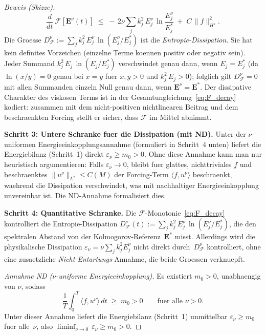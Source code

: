 \documentclass[12pt,a4paper]{article}
\theoremstyle{definition}
\theoremstyle{plain}
\theoremstyle{remark}
\begin{document}
\begin{proof}[Beweis (Skizze)]
\begin{equation}\label{eq:F_decay}
  \frac{d}{dt}\,\mathcal{F}[\mathbf{E}^\nu(t)]
  \;\le\;
  -\,2\nu \sum_{j} k_j^2\,
    E_j^\nu\,\ln\!\frac{E_j^\nu}{E_j^*}
  \;+\;
  C\,\|f\|_{H^s}^2.
\end{equation}
Die Groesse $D_\mathcal{F}^\nu := \sum_j k_j^2\,
E_j^\nu\,\ln(E_j^\nu/E_j^*)$ ist die \emph{Entropie-Dissipation}.
Sie hat kein definites Vorzeichen (einzelne Terme koennen positiv oder
negativ sein). Jeder Summand $k_j^2\,E_j\,\ln(E_j/E_j^*)$ verschwindet
genau dann, wenn $E_j = E_j^*$ (da $\ln(x/y) = 0$ genau bei $x = y$
fuer $x,y > 0$ und $k_j^2\,E_j > 0$); folglich gilt
$D_\mathcal{F}^\nu = 0$ mit allen Summanden einzeln Null genau dann,
wenn $\mathbf{E}^\nu = \mathbf{E}^*$. Der dissipative Charakter des viskosen Terms
ist in der Gesamtungleichung~\eqref{eq:F_decay} kodiert: zusammen mit
dem nicht-positiven nichtlinearen Beitrag und dem beschraenkten Forcing
stellt er sicher, dass $\mathcal{F}$ im Mittel abnimmt.

\textbf{Schritt 3: Untere Schranke fuer die Dissipation (mit ND).}\;
Unter der $\nu$-uniformen Energieeinkopplungsannahme (formuliert in
Schritt~4 unten) liefert die Energiebilanz (Schritt~1) direkt
$\varepsilon_\nu \ge m_0 > 0$. Ohne diese Annahme kann man nur
heuristisch argumentieren: Falls $\varepsilon_\nu \to 0$, bleibt fuer
glattes, nichttriviales $f$ und beschraenktes $\|u^\nu\|_{L^2} \le C(M)$
der Forcing-Term $\langle f, u^\nu \rangle$ beschraenkt, waehrend die
Dissipation verschwindet, was mit nachhaltiger Energieeinkopplung
unvereinbar ist. Die ND-Annahme formalisiert dies.

\textbf{Schritt 4: Quantitative Schranke.}\;
Die $\mathcal{F}$-Monotonie~\eqref{eq:F_decay} kontrolliert die
Entropie-Dissipation $D_\mathcal{F}^\nu(t) := \sum_j k_j^2\,
E_j^\nu\,\ln(E_j^\nu/E_j^*)$, die den spektralen Abstand
von der Kolmogorov-Referenz~$\mathbf{E}^*$ misst.
Allerdings wird die physikalische Dissipation
$\varepsilon_\nu = \nu\sum_j k_j^2 E_j^\nu$ nicht direkt
durch~$D_\mathcal{F}^\nu$ kontrolliert, ohne eine zusaetzliche
\emph{Nicht-Entartungs}-Annahme, die beide Groessen verknuepft.

\emph{Annahme ND ($\nu$-uniforme Energieeinkopplung).}\;
Es existiert $m_0 > 0$, unabhaengig von $\nu$, sodass
\begin{equation}\label{eq:ND}
  \frac{1}{T}\int_0^T \langle f, u^\nu \rangle\,dt \;\ge\; m_0 > 0
  \qquad \text{fuer alle } \nu > 0.
\end{equation}
Unter dieser Annahme liefert die Energiebilanz (Schritt~1) unmittelbar
$\varepsilon_\nu \ge m_0$ fuer alle~$\nu$, also
$\liminf_{\nu\to 0}\,\varepsilon_\nu \ge m_0 > 0$.


\end{proof}
\end{document}
